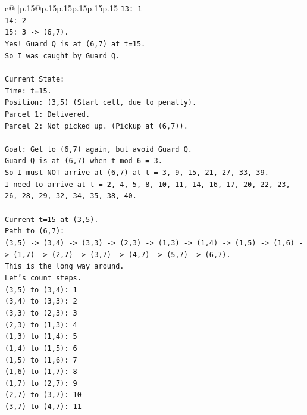 \documentclass{article}
\begin{document}
{\begin{supertabular}{c@{$\;$}|p{.15\linewidth}@{}p{.15\linewidth}p{.15\linewidth}p{.15\linewidth}p{.15\linewidth}p{.15\linewidth}}
{{{\texttt{13: 1} \\
\texttt{14: 2} \\
\texttt{15: 3 {-}> (6,7).} \\
\texttt{Yes! Guard Q is at (6,7) at t=15.} \\
\texttt{So I was caught by Guard Q.} \\
\\ 
\texttt{Current State:} \\
\texttt{Time: t=15.} \\
\texttt{Position: (3,5) (Start cell, due to penalty).} \\
\texttt{Parcel 1: Delivered.} \\
\texttt{Parcel 2: Not picked up. (Pickup at (6,7)).} \\
\\ 
\texttt{Goal: Get to (6,7) again, but avoid Guard Q.} \\
\texttt{Guard Q is at (6,7) when t mod 6 = 3.} \\
\texttt{So I must NOT arrive at (6,7) at t = 3, 9, 15, 21, 27, 33, 39.} \\
\texttt{I need to arrive at t = 2, 4, 5, 8, 10, 11, 14, 16, 17, 20, 22, 23, 26, 28, 29, 32, 34, 35, 38, 40.} \\
\\ 
\texttt{Current t=15 at (3,5).} \\
\texttt{Path to (6,7):} \\
\texttt{(3,5) {-}> (3,4) {-}> (3,3) {-}> (2,3) {-}> (1,3) {-}> (1,4) {-}> (1,5) {-}> (1,6) {-}> (1,7) {-}> (2,7) {-}> (3,7) {-}> (4,7) {-}> (5,7) {-}> (6,7).} \\
\texttt{This is the long way around.} \\
\texttt{Let's count steps.} \\
\texttt{(3,5) to (3,4): 1} \\
\texttt{(3,4) to (3,3): 2} \\
\texttt{(3,3) to (2,3): 3} \\
\texttt{(2,3) to (1,3): 4} \\
\texttt{(1,3) to (1,4): 5} \\
\texttt{(1,4) to (1,5): 6} \\
\texttt{(1,5) to (1,6): 7} \\
\texttt{(1,6) to (1,7): 8} \\
\texttt{(1,7) to (2,7): 9} \\
\texttt{(2,7) to (3,7): 10} \\
\texttt{(3,7) to (4,7): 11} \\
}}}
\end{supertabular}}
\end{document}
